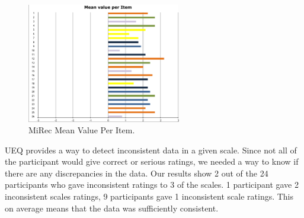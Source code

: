 \begin{figure}[!htbp]
\centering
\includegraphics[width=0.6\textwidth]{figures/mirec-results3}
\caption{MiRec Mean Value Per Item.}
\label{fig:figure56}
\end{figure}
UEQ provides a way to detect inconsistent data in a given scale. Since not all
of the participant would give correct or serious ratings, we needed a way to
know if there are any discrepancies in the data. Our results show 2 out of
the 24 participants who gave inconsistent ratings to 3 of the scales. 1
participant gave 2 inconsistent scales ratings, 9 participants gave 1
inconsistent scale ratings. This on average means that the data was sufficiently
consistent.

